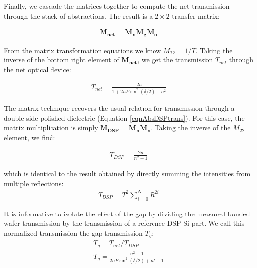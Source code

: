 \documentclass[osajnl,preprint,showpacs,superscriptaddress,12pt]{revtex4-1} %
\begin{document}
Finally, we cascade the matrices together to compute the net transmission through the stack of abstractions.  The result is a $2\times2$ transfer matrix:

\begin{eqnarray}
\boldsymbol{M_{net}}=\boldsymbol{M_n}\boldsymbol{M_g}\boldsymbol{M_n}
\end{eqnarray}

From the matrix transformation equations \cite{2007fuph.book.....S} we know $M_{22}=1/T$.  Taking the inverse of the bottom right element of $\boldsymbol{M_{net}}$, we get the transmission $T_{net}$ through the net optical device:

\begin{eqnarray}
T_{net}=\frac{2 n}{1+ 2n F\sin ^2(\delta/2)+n^2} \label{eqn:FPmatTrans}
\end{eqnarray}

The matrix technique recovers the usual relation for transmission through a double-side polished dielectric (Equation \ref{eqnAbsDSPtrans}).  For this case, the matrix multiplication is simply $\boldsymbol{M_{DSP}}=\boldsymbol{M_n}\boldsymbol{M_n}$.  Taking the inverse of the $M_{22}$ element, we find:

\begin{eqnarray}
T_{DSP}=\frac{2 n}{n^2+1}\label{eqn:EqofSummedSlab}
\end{eqnarray}

which is identical to the result obtained by directly summing the intensities from multiple reflections:
\begin{eqnarray}
T_{DSP}=T^2 \sum_{i=0}^{N}R^{2i} \label{eqn:multsum}
\end{eqnarray}

It is informative to isolate the effect of the gap by dividing the measured bonded wafer transmission by the transmission of a reference DSP Si part.  We call this normalized transmission the gap transmission $T_{g}$:
\begin{eqnarray}
T_{g} = T_{net}/T_{DSP} \\
T_{g} = \frac{n^2+1}{2 n F \sin ^2(\delta/2)+n^2+1} \label{eqn:Tetalon}
\end{eqnarray}








\end{document}

